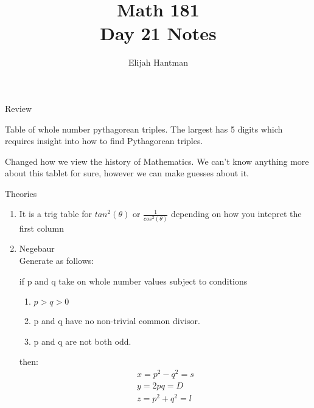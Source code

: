 \documentclass{report}
\title{\Huge{Math 181}\\Day 21 Notes}
\author{\huge{Elijah Hantman}}
\date{}
\begin{document}
\maketitle
\newpage

\begin{description}
    \item Review 
        \begin{mdframed}
            Table of whole number pythagorean triples.
            The largest has 5 digits which requires
            insight into how to find Pythagorean triples.
        \end{mdframed}
        \begin{mdframed}
            Changed how we view the history of Mathematics.
            We can't know anything more about this tablet for sure,
            however we can make guesses about it.
        \end{mdframed}
    \item Theories
        \begin{mdframed}
            \begin{enumerate}
                \item It is a trig table
                    for $tan^2(\theta)$ or  $\frac{1}{cos^2(\theta)}$ 
                    depending on how you intepret the first column
                \item Negebaur\\
                    Generate as follows:
                    \begin{mdframed}
                        if p and q take on whole number
                        values subject to conditions
                        \begin{enumerate}
                            \item $p > q > 0$
                            \item p and q have no non-trivial common
                                divisor.
                            \item p and q are not both odd.
                        \end{enumerate}
                        then:
                        \begin{gather}
                            x = p^2 - q^2 = s\\
                            y = 2pq = D\\
                            z = p^2 + q^2 = l
                        \end{gather}
                        

\end{mdframed}
\end{enumerate}
\end{mdframed}
\end{description}
\end{document}
